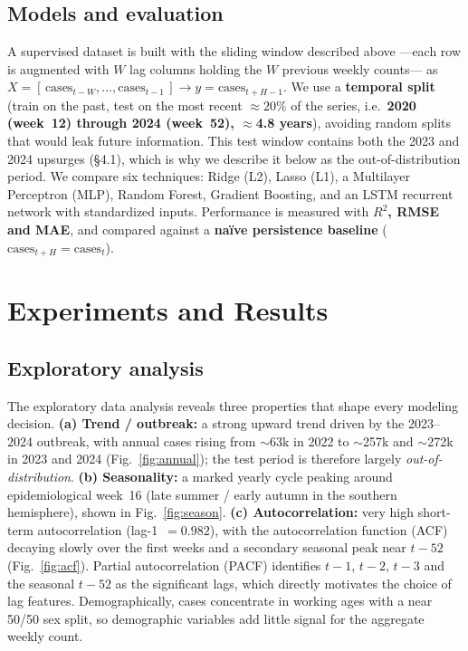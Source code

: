 \documentclass[runningheads]{llncs}
\newcommand{\Rsq}{$R^2$}
\begin{document}
\subsection{Models and evaluation}
A supervised dataset is built with the sliding window described above ---each row is
augmented with $W$ lag columns holding the $W$ previous weekly counts--- as
$X=[\,\text{cases}_{t-W},\dots,\text{cases}_{t-1}\,]\to y=\text{cases}_{t+H-1}$.
We use a \textbf{temporal split} (train on the past, test on the most recent $\approx20\%$
of the series, i.e.\ \textbf{2020 (week~12) through 2024 (week~52), $\approx$4.8 years}),
avoiding random splits that would leak future information. This test window contains both
the 2023 and 2024 upsurges (\S4.1), which is why we describe it below as the
out-of-distribution period. We compare
six techniques: Ridge (L2), Lasso (L1), a Multilayer Perceptron (MLP), Random Forest,
Gradient Boosting, and an LSTM recurrent network with standardized inputs. Performance is
measured with \textbf{\Rsq{}, RMSE and MAE}, and compared against a \textbf{na\"ive
persistence baseline} ($\text{cases}_{t+H}=\text{cases}_t$).

\section{Experiments and Results}

\subsection{Exploratory analysis}
The exploratory data analysis reveals three properties that shape every modeling decision.
\textbf{(a) Trend / outbreak:} a strong upward trend driven by the 2023--2024 outbreak,
with annual cases rising from $\sim$63k in 2022 to $\sim$257k and $\sim$272k in 2023 and 2024
(Fig.~\ref{fig:annual}); the test period is therefore largely \emph{out-of-distribution}.
\textbf{(b) Seasonality:} a marked yearly cycle peaking around epidemiological week~16
(late summer / early autumn in the southern hemisphere), shown in Fig.~\ref{fig:season}.
\textbf{(c) Autocorrelation:} very high short-term autocorrelation (lag-1~$=0.982$), with the
autocorrelation function (ACF) decaying slowly over the first weeks and a secondary seasonal
peak near $t{-}52$ (Fig.~\ref{fig:acf}). Partial autocorrelation (PACF) identifies $t{-}1$,
$t{-}2$, $t{-}3$ and the seasonal $t{-}52$ as the significant lags, which directly motivates
the choice of lag features. Demographically, cases concentrate in working ages with a near
50/50 sex split, so demographic variables add little signal for the aggregate weekly count.
\end{document}
